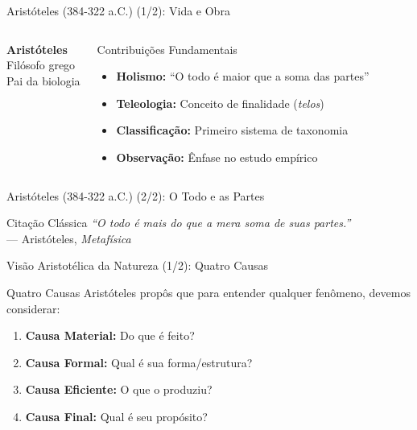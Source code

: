\begin{frame}{Aristóteles (384-322 a.C.) (1/2): Vida e Obra}
\begin{columns}
\begin{center}
\textbf{Aristóteles}\\
\vspace{0.2cm}
{\small Filósofo grego}\\
{\small Pai da biologia}
\end{center}

\begin{block}{Contribuições Fundamentais}
\begin{itemize}
    \item \textbf{Holismo:} ``O todo é maior que a soma das partes''
    \item \textbf{Teleologia:} Conceito de finalidade (\textit{telos})
    \item \textbf{Classificação:} Primeiro sistema de taxonomia
    \item \textbf{Observação:} Ênfase no estudo empírico
\end{itemize}
\end{block}
\end{columns}
\end{frame}

\begin{frame}{Aristóteles (384-322 a.C.) (2/2): O Todo e as Partes}
\begin{exampleblock}{Citação Clássica}
\textit{``O todo é mais do que a mera soma de suas partes.''}\\
--- Aristóteles, \textit{Metafísica}
\end{exampleblock}
\end{frame}

\begin{frame}{Visão Aristotélica da Natureza (1/2): Quatro Causas}
\begin{block}{Quatro Causas}
Aristóteles propôs que para entender qualquer fenômeno, devemos considerar:
\begin{enumerate}
    \item \textbf{Causa Material:} Do que é feito?
    \item \textbf{Causa Formal:} Qual é sua forma/estrutura?
    \item \textbf{Causa Eficiente:} O que o produziu?
    \item \textbf{Causa Final:} Qual é seu propósito?
\end{enumerate}
\end{block}
\end{frame}

